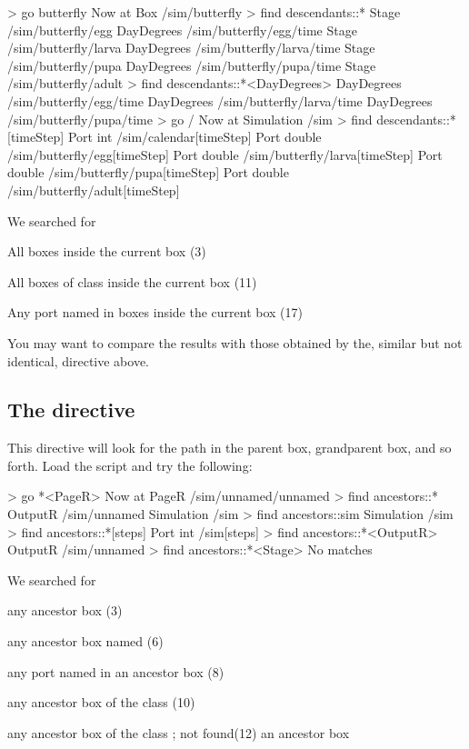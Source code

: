 \lstset{numbers=left}
\begin{usdialog}
> go butterfly
Now at Box /sim/butterfly
> find descendants::*
Stage      /sim/butterfly/egg
DayDegrees /sim/butterfly/egg/time
Stage      /sim/butterfly/larva
DayDegrees /sim/butterfly/larva/time
Stage      /sim/butterfly/pupa
DayDegrees /sim/butterfly/pupa/time
Stage      /sim/butterfly/adult
> find descendants::*<DayDegrees>
DayDegrees /sim/butterfly/egg/time
DayDegrees /sim/butterfly/larva/time
DayDegrees /sim/butterfly/pupa/time
> go /
Now at Simulation /sim
> find descendants::*[timeStep]
Port int    /sim/calendar[timeStep]
Port double /sim/butterfly/egg[timeStep]
Port double /sim/butterfly/larva[timeStep]
Port double /sim/butterfly/pupa[timeStep]
Port double /sim/butterfly/adult[timeStep]
\end{usdialog}
\lstset{numbers=none}

\noindent
We searched for 
\begin{compactitem}
\item All boxes inside the current box (3)
\item All boxes of class  inside the current box (11)
\item Any port named  in boxes inside the current box (17)
\end{compactitem}

You may want to compare the results with those obtained by the, similar but not identical,  directive above.

%
%
\subsection{The  directive}
This directive will look for the path in the parent box, grandparent box, and so forth. Load the  script and try the following:

\lstset{numbers=left}
\begin{usdialog}
> go *<PageR>
Now at PageR /sim/unnamed/unnamed
> find ancestors::*
OutputR    /sim/unnamed
Simulation /sim
> find ancestors::sim
Simulation /sim
> find ancestors::*[steps]
Port int /sim[steps]
> find ancestors::*<OutputR>
OutputR /sim/unnamed
> find ancestors::*<Stage>
No matches
\end{usdialog}
\lstset{numbers=none}

\noindent
We searched for 
\begin{compactitem}
\item any ancestor box (3)
\item any ancestor box named  (6)
\item any port named  in an ancestor box (8)
\item any ancestor box of the class  (10)
\item any ancestor box of the class ; not found(12)
an ancestor box
\end{compactitem}


